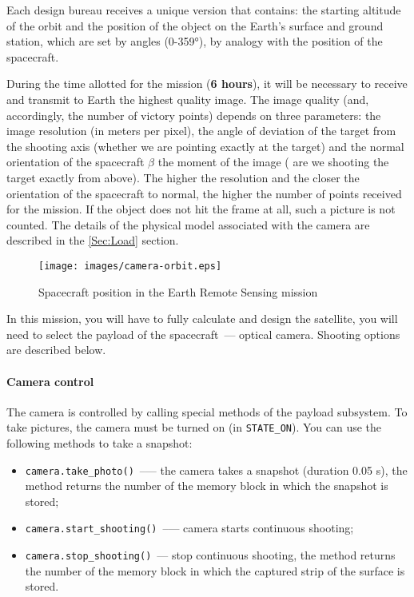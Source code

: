 \documentclass[12pt,a4paper]{article}
\begin{document}
Each design bureau receives a unique version that contains: the starting altitude of the orbit and the position of the object on the Earth's surface and ground station, which are set by angles (0-359°), by analogy with the position of the spacecraft.

During the time allotted for the mission (\textbf{6 hours}), it will be necessary to receive and transmit to Earth the highest quality image. The image quality (and, accordingly, the number of victory points) depends on three parameters: the image resolution (in meters per pixel), the angle of deviation of the target from the shooting axis (whether we are pointing exactly at the target) and the normal orientation of the spacecraft $\beta$ the moment of the image ( are we shooting the target exactly from above). The higher the resolution and the closer the orientation of the spacecraft to normal, the higher the number of points received for the mission. If the object does not hit the frame at all, such a picture is not counted. The details of the physical model associated with the camera are described in the \ref{Sec:Load} section.

\begin{figure}[tbh]
  \begin{center}
    \texttt{[image: images/camera-orbit.eps]}
    \caption{Spacecraft position in the Earth Remote Sensing mission}
    \label{Pic:Camera-DZZ}
  \end{center}
\end{figure}

In this mission, you will have to fully calculate and design the satellite, you will need to select the payload of the spacecraft~--- optical camera. Shooting options are described below.

\paragraph{Camera control}

The camera is controlled by calling special methods of the payload subsystem. To take pictures, the camera must be turned on (in \verb'STATE_ON'). You can use the following methods to take a snapshot:

\begin{itemize}
\item \verb'camera.take_photo()'~--— the camera takes a snapshot (duration 0.05 s), the method returns the number of the memory block in which the snapshot is stored;
\item \verb'camera.start_shooting()'~--— camera starts continuous shooting;
\item \verb'camera.stop_shooting()'~--- stop continuous shooting, the method returns the number of the memory block in which the captured strip of the surface is stored.
\end{itemize}
\end{document}
